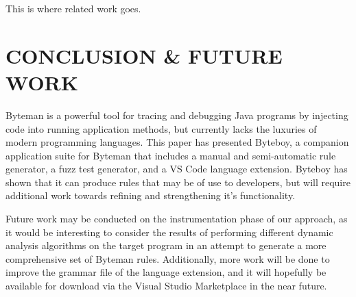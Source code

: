 \documentclass[letterpaper,twocolumn,10pt]{article}
\begin{document}
This is where related work goes. \\

\section{CONCLUSION \& FUTURE WORK}

Byteman is a powerful tool for tracing and debugging Java programs by injecting code into running application methods, but currently lacks the luxuries of modern programming languages. This paper has presented Byteboy, a companion application suite for Byteman that includes a manual and semi-automatic rule generator, a fuzz test generator, and a VS Code language extension. Byteboy has shown that it can produce rules that may be of use to developers, but will require additional work towards refining and strengthening it's functionality.

Future work may be conducted on the instrumentation phase of our approach, as it would be interesting to consider the results of performing different dynamic analysis algorithms on the target program in an attempt to generate a more comprehensive set of Byteman rules. Additionally, more work will be done to improve the grammar file of the language extension, and it will hopefully be available for download via the Visual Studio Marketplace in the near future.
\end{document}
